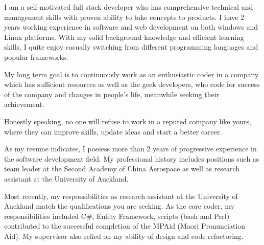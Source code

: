 \documentclass[11pt, a4paper]{awesome-cv} %
\begin{document}
\makecvheader %

\makelettertitle %


\begin{cvletter}



I am a self-motivated full stack developer who has comprehensive technical and management skills with proven ability to take concepts to products. I have 2 years working experience in software and web development on both windows and Linux platforms. With my solid background knowledge and efficient learning skills, I quite enjoy casually switching from different programming languages and popular frameworks. 

My long term goal is to continuously work as an enthusiastic coder in a company which has sufficient resources as well as the geek developers, who code for success of the company and changes in people's life, meanwhile seeking their achievement.



Honestly speaking, no one will refuse to work in a reputed company like yours, where they can improve skills, update ideas and start a better career. 


As my resume indicates, I possess more than 2 years of progressive experience in the software development field.  My professional history includes positions such as team leader at the Second Academy of China Aerospace as well as research assistant at the University of Auckland.

Most recently, my responsibilities as research assistant at the University of Auckland match the qualifications you are seeking.  As the core coder, my responsibilities included C\#, Entity Framework, scripts (bash and Perl) contributed to the successful completion of the MPAid (Maori Pronunciation Aid).  My supervisor also relied on my ability of design and code refactoring.


\end{cvletter}


\makeletterclosing %
\end{document}
